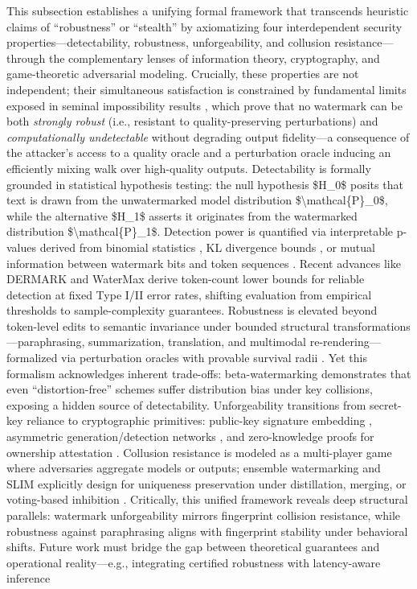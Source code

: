 \documentclass[11pt,a4paper]{article}
\begin{document}
This subsection establishes a unifying formal framework that transcends heuristic claims of ``robustness'' or ``stealth'' by axiomatizing four interdependent security properties---detectability, robustness, unforgeability, and collusion resistance---through the complementary lenses of information theory, cryptography, and game-theoretic adversarial modeling. Crucially, these properties are not independent; their simultaneous satisfaction is constrained by fundamental limits exposed in seminal impossibility results \cite{arxiv:2505.06827}, which prove that no watermark can be both \emph{strongly robust} (i.e., resistant to quality-preserving perturbations) and \emph{computationally undetectable} without degrading output fidelity---a consequence of the attacker's access to a quality oracle and a perturbation oracle inducing an efficiently mixing walk over high-quality outputs. Detectability is formally grounded in statistical hypothesis testing: the null hypothesis \$H\_0\$ posits that text is drawn from the unwatermarked model distribution \$\textbackslash{}mathcal\{P\}\_0\$, while the alternative \$H\_1\$ asserts it originates from the watermarked distribution \$\textbackslash{}mathcal\{P\}\_1\$. Detection power is quantified via interpretable p-values derived from binomial statistics \cite{arxiv:2301.10226}, KL divergence bounds \cite{arxiv:2306.04634}, or mutual information between watermark bits and token sequences \cite{arxiv:2301.10226}. Recent advances like DERMARK \cite{arxiv:2406.10281} and WaterMax \cite{arxiv:2403.04808} derive token-count lower bounds for reliable detection at fixed Type I/II error rates, shifting evaluation from empirical thresholds to sample-complexity guarantees. Robustness is elevated beyond token-level edits to semantic invariance under bounded structural transformations---paraphrasing, summarization, translation, and multimodal re-rendering---formalized via perturbation oracles with provable survival radii \cite{doi:10.18653/v1/2024.findings-naacl.40,doi:10.18653/v1/2023.acl-long.117}. Yet this formalism acknowledges inherent trade-offs: beta-watermarking \cite{arxiv:2406.02603} demonstrates that even ``distortion-free'' schemes suffer distribution bias under key collisions, exposing a hidden source of detectability. Unforgeability transitions from secret-key reliance to cryptographic primitives: public-key signature embedding \cite{arxiv:2402.16187}, asymmetric generation/detection networks \cite{arxiv:2405.13517}, and zero-knowledge proofs for ownership attestation \cite{doi:10.1109/dac56929.2023.10247798}. Collusion resistance is modeled as a multi-player game where adversaries aggregate models or outputs; ensemble watermarking \cite{arxiv:2402.16187} and SLIM \cite{arxiv:2601.01296} explicitly design for uniqueness preservation under distillation, merging, or voting-based inhibition \cite{arxiv:2601.04261}. Critically, this unified framework reveals deep structural parallels: watermark unforgeability mirrors fingerprint collision resistance, while robustness against paraphrasing aligns with fingerprint stability under behavioral shifts. Future work must bridge the gap between theoretical guarantees and operational reality---e.g., integrating certified robustness \cite{doi:10.18653/v1/2024.findings-naacl.40} with latency-aware inference 
\end{document}

